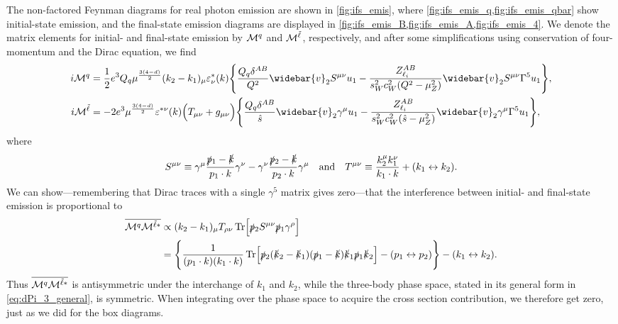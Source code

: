 The non-factored Feynman diagrams for real photon emission are shown in \cref{fig:ifs_emis}, where \cref{fig:ifs_emis_q,fig:ifs_emis_qbar} show initial-state emission, and the final-state emission diagrams are displayed in \cref{fig:ifs_emis_B,fig:ifs_emis_A,fig:ifs_emis_4}.
We denote the matrix elements for initial- and final-state emission by $\mathcal{M}^q$ and $\mathcal{M}^{\tilde{\ell}}$, respectively, and after some simplifications using conservation of four-momentum and the Dirac equation, we find
\begin{subequations}
\begin{align}
    i\M^q &= \frac{1}{2}e^3Q_q\mu^{\frac{3(4-d)}{2}} (k_2-k_1)_\mu \eps_\nu^*(k)
    \Biggl\{
        \frac{Q_q\delta^{AB}}{Q^2} \widebar{v}_2 S^{\mu\nu} u_1
        - \frac{\zliab}{s_W^2c_W^2(Q^2-\mu_Z^2)} \widebar{v}_2 S^{\mu\nu} \Gamma^5 u_1
    \Biggr\},
    \\
    i\M^\slepton &= -2e^3\mu^{\frac{3(4-d)}{2}} \eps^{*\nu}(k) \Bigl( T_{\mu\nu} + g_{\mu\nu} \Bigr)
    \Biggl\{
        \frac{Q_q\delta^{AB}}{\shat} \widebar{v}_2\gamma^\mu u_1
        - \frac{\zliab}{s_W^2c_W^2(\shat-\mu_Z^2)} \widebar{v}_2\gamma^\mu\Gamma^5 u_1
    \Biggr\},
\end{align}
\end{subequations}
where
\begin{equation}
    S^{\mu\nu} \equiv \gamma^\mu \frac{\slashed{p}{}_1-\slashed{k}}{p_1\cdot k} \gamma^\nu
    - \gamma^\nu \frac{\slashed{p}{}_2-\slashed{k}}{p_2\cdot k} \gamma^\mu
    \quad \text{and} \quad
    T^{\mu\nu} \equiv \frac{k_2^\mu k_1^\nu}{k_1\cdot k} + (k_1 \leftrightarrow k_2).
\end{equation}
We can show---remembering that Dirac traces with a single $\gamma^5$ matrix gives zero---that the interference between initial- and final-state emission is proportional to
\begin{align}
    \overline{\mathcal{M}^q\mathcal{M}^{{\tilde{\ell}}*}} &\propto (k_2-k_1)_\mu T_{\rho\nu} \operatorname{Tr}\Bigl[
        \slashed{p}{}_2 S^{\mu\nu} \slashed{p}{}_1 \gamma^\rho
    \Bigr]
    \nonumber \\
    &= \Biggl\{
        \frac{1}{(p_1\cdot k)(k_1\cdot k)}
        \operatorname{Tr}\Bigl[ \slashed{p}{}_2(\slashed{k}{}_2-\slashed{k}{}_1)(\slashed{p}{}_1-\slashed{k})\slashed{k}{}_1\slashed{p}{}_1\slashed{k}{}_2 \Bigr]
        - (p_1 \leftrightarrow p_2)
    \Biggr\} - (k_1 \leftrightarrow k_2).
\end{align}
Thus $\overline{\mathcal{M}^q\mathcal{M}^{{\tilde{\ell}}*}}$ is antisymmetric under the interchange of $k_1$ and $k_2$, while the three-body phase space, stated in its general form in \cref{eq:dPi_3_general}, is symmetric. When integrating over the phase space to acquire the cross section contribution, we therefore get zero, just as we did for the box diagrams.



